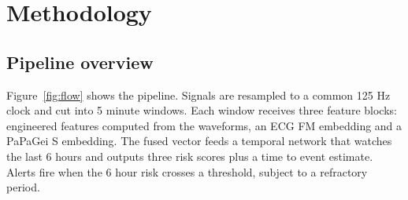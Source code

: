 \documentclass[11pt]{article}
\begin{document}
\section{Methodology}

\subsection{Pipeline overview}
Figure~\ref{fig:flow} shows the pipeline. Signals are resampled to a common 125 Hz
clock and cut into 5 minute windows. Each window receives three feature blocks:
engineered features computed from the waveforms, an ECG FM embedding and a
PaPaGei S embedding. The fused vector feeds a temporal network that watches the
last 6 hours and outputs three risk scores plus a time to event estimate. Alerts
fire when the 6 hour risk crosses a threshold, subject to a refractory period.
\end{document}
